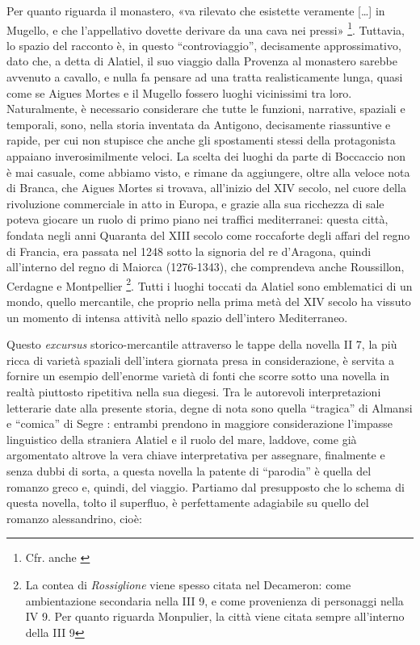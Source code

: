 Per quanto riguarda il monastero, «va rilevato che esistette veramente
{[}\ldots{}{]} in Mugello, e che l'appellativo dovette derivare da una
cava nei pressi» \footnote{\autocite[p.~254]{brancadecameron}Cfr. anche
  \autocite[p.~211]{manni1742}}. Tuttavia, lo spazio del racconto è, in
questo ``controviaggio'', decisamente approssimativo, dato che, a detta
di Alatiel, il suo viaggio dalla Provenza al monastero sarebbe avvenuto
a cavallo, e nulla fa pensare ad una tratta realisticamente lunga, quasi
come se Aigues Mortes e il Mugello fossero luoghi vicinissimi tra loro.
Naturalmente, è necessario considerare che tutte le funzioni, narrative,
spaziali e temporali, sono, nella storia inventata da Antigono,
decisamente riassuntive e rapide, per cui non stupisce che anche gli
spostamenti stessi della protagonista appaiano inverosimilmente veloci.
La scelta dei luoghi da parte di Boccaccio non è mai casuale, come
abbiamo visto, e rimane da aggiungere, oltre alla veloce nota di Branca,
che Aigues Mortes si trovava, all'inizio del XIV secolo, nel cuore della
rivoluzione commerciale in atto in Europa, e grazie alla sua ricchezza
di sale poteva giocare un ruolo di primo piano nei traffici
mediterranei: questa città, fondata negli anni Quaranta del XIII secolo
come roccaforte degli affari del regno di Francia, era passata nel 1248
sotto la signoria del re d'Aragona, quindi all'interno del regno di
Maiorca (1276-1343), che comprendeva anche Roussillon, Cerdagne e
Montpellier \footnote{La contea di \emph{Rossiglione} viene spesso
  citata nel Decameron: come ambientazione secondaria nella III 9, e
  come provenienza di personaggi nella IV 9. Per quanto riguarda
  Monpulier, la città viene citata sempre all'interno della III 9}.
Tutti i luoghi toccati da Alatiel sono emblematici di un mondo, quello
mercantile, che proprio nella prima metà del XIV secolo ha vissuto un
momento di intensa attività nello spazio dell'intero Mediterraneo.

Questo \emph{excursus} storico-mercantile attraverso le tappe della
novella II 7, la più ricca di varietà spaziali dell'intera giornata
presa in considerazione, è servita a fornire un esempio dell'enorme
varietà di fonti che scorre sotto una novella in realtà piuttosto
ripetitiva nella sua diegesi. Tra le autorevoli interpretazioni
letterarie date alla presente storia, degne di nota sono quella
``tragica'' di Almansi \autocite[pp.~82-131]{almansi1974} e ``comica''
di Segre \autocite[pp.~145-159]{segre1974}: entrambi prendono in
maggiore considerazione l'impasse linguistico della straniera Alatiel e
il ruolo del mare, laddove, come già argomentato altrove
\autocite{bolpagni2016} la vera chiave interpretativa per assegnare,
finalmente e senza dubbi di sorta, a questa novella la patente di
``parodia'' è quella del romanzo greco e, quindi, del viaggio. Partiamo
dal presupposto che lo schema di questa novella, tolto il superfluo, è
perfettamente adagiabile su quello del romanzo alessandrino, cioè:

